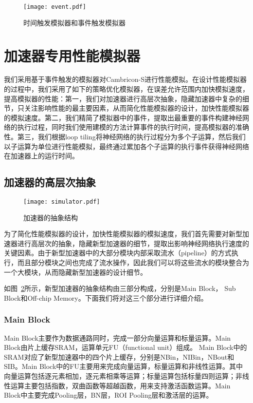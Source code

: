 \begin{figure}[h]
\centering
\texttt{[image: event.pdf]}
\caption{时间触发模拟器和事件触发模拟器}
\label{fig:event}
\end{figure}

\section{加速器专用性能模拟器}

我们采用基于事件触发的模拟器对Cambricon-S进行性能模拟。在设计性能模拟器的过程中，我们采用了如下的策略优化模拟器，在误差允许范围内加快模拟速度，提高模拟器的性能：第一，我们对加速器进行高层次抽象，隐藏加速器中复杂的细节，只关注影响性能的最主要因素，从而简化性能模拟器的设计，加快性能模拟器的模拟速度。第二，我们精简了模拟器中的事件，提取出最重要的事件构建神经网络的执行过程，同时我们使用建模的方法计算事件的执行时间，提高模拟器的准确性。第三，我们根据loop tiling将神经网络的执行过程分为多个子运算，然后我们以子运算为单位进行性能模拟，最终通过累加各个子运算的执行事件获得神经网络在加速器上的运行时间。


\subsection{加速器的高层次抽象}

\begin{figure}[h]
\centering
\texttt{[image: simulator.pdf]}
\caption{加速器的抽象结构}
\label{fig:simulator}
\end{figure}

为了简化性能模拟器的设计，加快性能模拟器的模拟速度，我们首先需要对新型加速器进行高层次的抽象，隐藏新型加速器的细节，提取出影响神经网络执行速度的关键因素。由于新型加速器中的大部分模块内部采取流水（pipeline）的方式执行，而且部分模块之间也完成了流水操作，因此我们可以将这些流水的模块整合为一个大模块，从而隐藏新型加速器的设计细节。

如图~\ref{fig:simulator}所示，新型加速器的抽象结构由三部分构成，分别是Main Block， Sub Block和Off-chip Memory。下面我们将对这三个部分进行详细介绍。

\subsubsection{Main Block}
Main Block主要作为数据通路同时，完成一部分向量运算和标量运算。Main Block由片上缓存SRAM，运算单元FU（functional unit）组成。
Main Block中的SRAM对应了新型加速器中的四个片上缓存，分别是NBin，NIBin，NBout和SIB。Main Block中的FU主要用来完成向量运算，标量运算和非线性运算。其中向量运算包括逐元素相加，逐元素相乘等运算；标量运算包括标量四则运算；非线性运算主要包括指数，双曲函数等超越函数，用来支持激活函数运算。Main Block中主要完成Pooling层，BN层，ROI Pooling层和激活层的运算。

